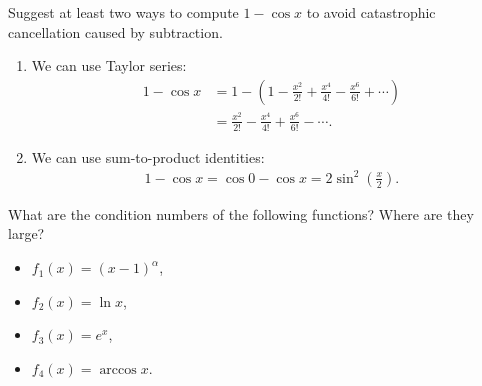 \documentclass[11pt]{elegantbook}
\begin{document}
\vspace{1em}

\begin{problem}
  Suggest at least two ways to compute $1-\cos x$ to avoid catastrophic cancellation caused by subtraction.
\end{problem}

\begin{solution}
  \begin{enumerate}[(1)]
    \item We can use Taylor series:
    \begin{align*}
      1-\cos x&=1-\left(1-\frac{x^2}{2!}+\frac{x^4}{4!}-\frac{x^6}{6!}+\cdots\right)\\
      &=\frac{x^2}{2!}-\frac{x^4}{4!}+\frac{x^6}{6!}-\cdots.
    \end{align*}

    \item We can use sum-to-product identities:
    \begin{align*}
      1-\cos x= \cos 0- \cos x= 2\sin^2\left(\frac{x}{2}\right).
    \end{align*}
  \end{enumerate}
\end{solution}

\vspace{1em}

\begin{problem}
  What are the condition numbers of the following functions? Where are they large?
  \begin{itemize}
    \item $f_1(x)=(x-1)^\alpha$,
    \item $f_2(x)=\ln x$,
    \item $f_3(x)=e^x$,
    \item $f_4(x)=\arccos x$.
  \end{itemize}
\end{problem}
\end{document}
